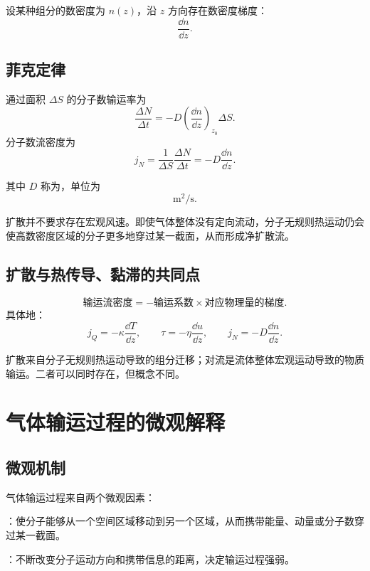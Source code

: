 设某种组分的数密度为 \(n(z)\)，沿 \(z\) 方向存在数密度梯度：
\[
  \frac{\dd n}{\dd z}.
\]

\subsection{菲克定律}

\begin{FormulaBox}[菲克定律]
通过面积 \(\Delta S\) 的分子数输运率为
\[
  \boxed{
  \frac{\Delta N}{\Delta t}
  =
  -D
  \left(\frac{\dd n}{\dd z}\right)_{z_0}
  \Delta S
  }.
\]
分子数流密度为
\[
  \boxed{
  j_N
  =
  \frac{1}{\Delta S}\frac{\Delta N}{\Delta t}
  =
  -D\frac{\dd n}{\dd z}
  }.
\]
\end{FormulaBox}

其中 \(D\) 称为，单位为
\[
  \mathrm{m^2/s}.
\]

\begin{KeyBox}[扩散的物理含义]
扩散并不要求存在宏观风速。即使气体整体没有定向流动，分子无规则热运动仍会使高数密度区域的分子更多地穿过某一截面，从而形成净扩散流。
\end{KeyBox}

\subsection{扩散与热传导、黏滞的共同点}

\begin{FormulaBox}[三种宏观规律的统一形式]
\[
  \text{输运流密度}
  =
  -
  \text{输运系数}
  \times
  \text{对应物理量的梯度}.
\]
具体地：
\[
  j_Q=-\kappa\frac{\dd T}{\dd z},
  \qquad
  \tau=-\eta\frac{\dd u}{\dd z},
  \qquad
  j_N=-D\frac{\dd n}{\dd z}.
\]
\end{FormulaBox}

\begin{WarnBox}[扩散不是对流]
扩散来自分子无规则热运动导致的组分迁移；对流是流体整体宏观运动导致的物质输运。二者可以同时存在，但概念不同。
\end{WarnBox}

\section{气体输运过程的微观解释}

\subsection{微观机制}

气体输运过程来自两个微观因素：
\begin{ReviewList}
  \item {}：使分子能够从一个空间区域移动到另一个区域，从而携带能量、动量或分子数穿过某一截面。
  \item {}：不断改变分子运动方向和携带信息的距离，决定输运过程强弱。
\end{ReviewList}

